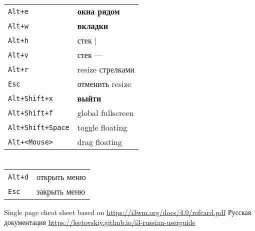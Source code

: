 \begin{multicols}{3}
\section{}
\begin{tabular}{@{}ll@{}}
    \verb!Alt+e! & \textbf{окна рядом} \\
    \verb!Alt+w! & \textbf{вкладки} \\
    \verb!Alt+h! & стек | \\
    \verb!Alt+v! & стек --- \\
    \verb!Alt+r! & resize стрелками \\
	\verb!Esc! & отменить resize \\
    \verb!Alt+Shift+x! & \textbf{выйти} \\
    \verb!Alt+Shift+f! & global fullscreen \\
    \verb!Alt+Shift+Space! & toggle floating \\
    \verb!Alt+<Mouse>! & drag floating \\
\end{tabular}

\section{}
\begin{tabular}{@{}ll@{}}
	\verb!Alt+d! & открыть меню \\
	\verb!Esc! & закрыть меню \\
\end{tabular}

\vspace{.5in}
Single page cheat sheet based on \url{https://i3wm.org/docs/4.0/refcard.pdf}
Русская документация \url{https://leetovskiy.github.io/i3-russian-userguide}

\end{multicols}


